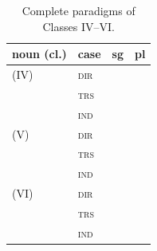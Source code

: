 \begin{table}[ht]
  \footnotesize
  \caption{Complete paradigms of Classes IV--VI.}
  \ifparadigmappendix\else\label{tab:nm-paradigms-iv-vi}\fi
  \begin{tabularx}{\textwidth}{l l L L}
    \toprule
    {\sc noun (cl.)} & {\sc case} & {\sc sg} & {\sc pl} \\
    \midrule
     (IV) & \textsc{dir} &  &  \\
     & \textsc{trs} &  &  \\
     & \textsc{ind} &  &  \\
    \addlinespace
     (V) & \textsc{dir} &  &  \\
     & \textsc{trs} &  &  \\
     & \textsc{ind} &  &  \\
    \addlinespace
     (VI) & \textsc{dir} &  &  \\
     & \textsc{trs} &  &  \\
     & \textsc{ind} &  &  \\
    \bottomrule
  \end{tabularx}
\end{table}
